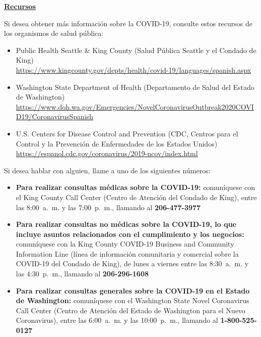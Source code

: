 \documentclass[10pt]{article}
\begin{document}
\bigskip

\large \underline{\textbf{Recursos}}

Si desea obtener más información sobre la COVID-19, consulte estos recursos de
los organismos de salud pública:

\begin{itemize}
\item
  Public Health \textemdash Seattle \& King County (Salud Pública \textemdash Seattle y el Condado de King)\\
  \url{https://www.kingcounty.gov/depts/health/covid-19/languages/spanish.aspx}

\item

  Washington State Department of Health (Departamento de Salud del Estado de Washington)\\
  \url{https://www.doh.wa.gov/Emergencies/NovelCoronavirusOutbreak2020COVID19/CoronavirusSpanish}

\item
  U.S. Centers for Disease Control and Prevention (CDC, Centros para el Control
  y la Prevención de Enfermedades de los Estados Unidos)\\
  \url{https://espanol.cdc.gov/coronavirus/2019-ncov/index.html}

\end{itemize}

Si desea hablar con alguien, llame a uno de los siguientes números:

\begin{itemize}

\item

  \textbf{Para realizar consultas médicas sobre la COVID-19:} comuníquese con el
  King County Call Center (Centro de Atención del Condado de King), entre las
  8:00 a. m. y las 7:00 p. m., llamando al \textbf{206-477-3977}

\item

  \textbf{Para realizar consultas no médicas sobre la COVID-19, lo que incluye
  asuntos relacionados con el cumplimiento y los negocios:} comuníquese con la
  King County COVID-19 Business and Community Information Line (línea de
  información comunitaria y comercial sobre la COVID-19 del Condado de King), de
  lunes a viernes entre las 8:30 a. m. y las 4:30 p. m., llamando al
  \textbf{206-296-1608}

\item

  \textbf{Para realizar consultas generales sobre la COVID-19 en el Estado de
  Washington:} comuníquese con el Washington State Novel Coronavirus Call Center
  (Centro de Atención del Estado de Washington para el Nuevo Coronavirus), entre
  las 6:00 a. m. y las 10:00 p. m., llamando al \textbf{1-800-525-0127}

\end{itemize}
\end{document}
